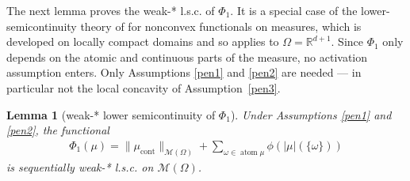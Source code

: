 \documentclass[11pt]{amsart}
\newtheorem{lemma}[theorem]{Lemma}
\theoremstyle{definition}
\theoremstyle{remark}
\DeclareMathOperator{\atom}{atom}
\DeclareMathOperator{\cont}{cont}
\begin{document}
The next lemma proves the weak-* l.s.c. of $\Phi_1$. It is a special case of
the lower-semicontinuity theory of \cite{bouchitte1990new} for nonconvex
functionals on measures, which is developed on locally compact domains and so
applies to $\Omega = \mathbb{R}^{d+1}$. Since $\Phi_1$ only depends on the
atomic and continuous parts of the measure, no activation assumption enters.
Only Assumptions \ref{pen1} and \ref{pen2} are needed --- in particular not
the local concavity of Assumption~\ref{pen3}.
\begin{lemma}[weak-* lower semicontinuity of $\Phi_1$] \label{lem:lsc}
Under Assumptions \ref{pen1} and \ref{pen2}, the functional
\begin{align*}
	\Phi_1(\mu) = \|\mu_{\cont}\|_{\mathcal{M}(\Omega)} + \sum_{ \omega \in \atom \mu } \phi(|\mu|(\{\omega\}))
\end{align*} 
is sequentially weak-* l.s.c. on $\mathcal{M}(\Omega)$.
\end{lemma}
\end{document}
